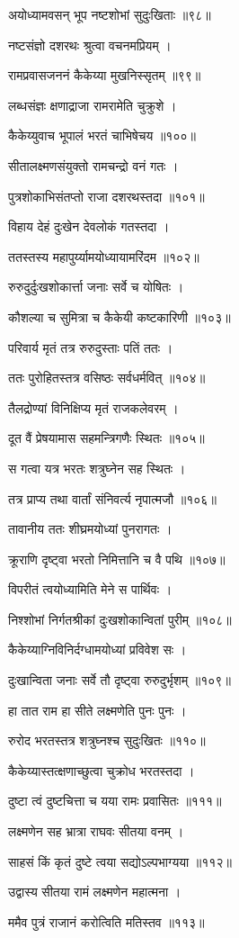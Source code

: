 अयोध्यामवसन् भूप नष्टशोभां सुदुःखिताः ॥९८॥

नष्टसंज्ञो दशरथः श्रुत्वा वचनमप्रियम् ।

रामप्रवासजननं कैकेय्या मुखनिस्सृतम् ॥९९॥

लब्धसंज्ञः क्षणाद्राजा रामरामेति चुक्रुशे ।

कैकेय्युवाच भूपालं भरतं चाभिषेचय ॥१००॥

सीतालक्ष्मणसंयुक्तो रामचन्द्रो वनं गतः ।

पुत्रशोकाभिसंतप्तो राजा दशरथस्तदा ॥१०१॥

विहाय देहं दुःखेन देवलोकं गतस्तदा ।

ततस्तस्य महापुर्य्यामयोध्यायामरिंदम ॥१०२॥

रुरुदुर्दुःखशोकार्त्ता जनाः सर्वे च योषितः ।

कौशल्या च सुमित्रा च कैकेयी कष्टकारिणी ॥१०३॥

परिवार्य मृतं तत्र रुरुदुस्ताः पतिं ततः ।

ततः पुरोहितस्तत्र वसिष्ठः सर्वधर्मवित् ॥१०४॥

तैलद्रोण्यां विनिक्षिप्य मृतं राजकलेवरम् ।

दूत वैं प्रेषयामास सहमन्त्रिगणैः स्थितः ॥१०५॥

स गत्वा यत्र भरतः शत्रुघ्नेन सह स्थितः ।

तत्र प्राप्य तथा वार्तां संनिवर्त्य नृपात्मजौ ॥१०६॥

तावानीय ततः शीघ्रमयोध्यां पुनरागतः ।

क्रूराणि दृष्ट्वा भरतो निमित्तानि च वै पथि ॥१०७॥

विपरीतं त्वयोध्यामिति मेने स पार्थिवः ।

निश्शोभां निर्गतश्रीकां दुःखशोकान्वितां पुरीम् ॥१०८॥

कैकेय्याग्निविनिर्दग्धामयोध्यां प्रविवेश सः ।

दुःखान्विता जनाः सर्वे तौ दृष्ट्वा रुरुदुर्भृशम् ॥१०९॥

हा तात राम हा सीते लक्ष्मणेति पुनः पुनः ।

रुरोद भरतस्तत्र शत्रुघ्नश्च सुदुःखितः ॥११०॥

कैकेय्यास्तत्क्षणाच्छुत्वा चुक्रोध भरतस्तदा ।

दुष्टा त्वं दुष्टचित्ता च यया रामः प्रवासितः ॥१११॥

लक्ष्मणेन सह भ्रात्रा राघवः सीतया वनम् ।

साहसं किं कृतं दुष्टे त्वया सद्यो‍ऽल्पभाग्यया ॥११२॥

उद्वास्य सीतया रामं लक्ष्मणेन महात्मना ।

ममैव पुत्रं राजानं करोत्विति मतिस्तव ॥११३॥


